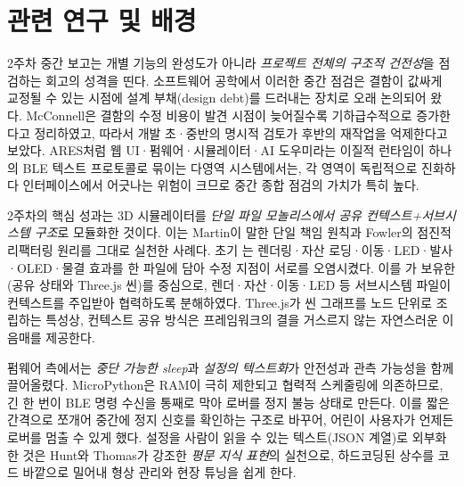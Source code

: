 

\section{관련 연구 및 배경}

2주차 중간 보고는 개별 기능의 완성도가 아니라 \emph{프로젝트 전체의 구조적 건전성}을 점검하는 회고의 성격을 띤다. 소프트웨어 공학에서 이러한 중간 점검은 결함이 값싸게 교정될 수 있는 시점에 설계 부채(design debt)를 드러내는 장치로 오래 논의되어 왔다. McConnell은 결함의 수정 비용이 발견 시점이 늦어질수록 기하급수적으로 증가한다고 정리하였고, 따라서 개발 초·중반의 명시적 검토가 후반의 재작업을 억제한다고 보았다\cite{mcconnell2004codecomplete}. ARES처럼 웹 UI·펌웨어·시뮬레이터·AI 도우미라는 이질적 런타임이 하나의 BLE 텍스트 프로토콜로 묶이는 다영역 시스템에서는, 각 영역이 독립적으로 진화하다 인터페이스에서 어긋나는 위험이 크므로 중간 종합 점검의 가치가 특히 높다.

2주차의 핵심 성과는 3D 시뮬레이터를 \emph{단일 파일 모놀리스에서 공유 컨텍스트+서브시스템 구조}로 모듈화한 것이다. 이는 Martin이 말한 단일 책임 원칙과 Fowler의 점진적 리팩터링 원리를 그대로 실천한 사례다\cite{martin2008cleancode,fowler2018refactoring}. 초기 는 렌더링·자산 로딩·이동·LED·발사·OLED·물결 효과를 한 파일에 담아 수정 지점이 서로를 오염시켰다. 이를 가 보유한 (공유 상태와 Three.js 씬)를 중심으로, 렌더·자산·이동·LED 등 서브시스템 파일이 컨텍스트를 주입받아 협력하도록 분해하였다. Three.js가 씬 그래프를 노드 단위로 조립하는 특성상\cite{threejs}, 컨텍스트 공유 방식은 프레임워크의 결을 거스르지 않는 자연스러운 이음매를 제공한다.

펌웨어 측에서는 \emph{중단 가능한 sleep}과 \emph{설정의 텍스트화}가 안전성과 관측 가능성을 함께 끌어올렸다. MicroPython은 RAM이 극히 제한되고 협력적 스케줄링에 의존하므로\cite{micropython,rp2040}, 긴  한 번이 BLE 명령 수신을 통째로 막아 로버를 정지 불능 상태로 만든다. 이를 짧은 간격으로 쪼개어 중간에 정지 신호를 확인하는 구조로 바꾸어, 어린이 사용자가 언제든 로버를 멈출 수 있게 했다. 설정을 사람이 읽을 수 있는 텍스트(JSON 계열)로 외부화한 것은 Hunt와 Thomas가 강조한 \emph{평문 지식 표현}의 실천으로\cite{hunt1999pragmatic}, 하드코딩된 상수를 코드 바깥으로 밀어내 형상 관리와 현장 튜닝을 쉽게 한다.

